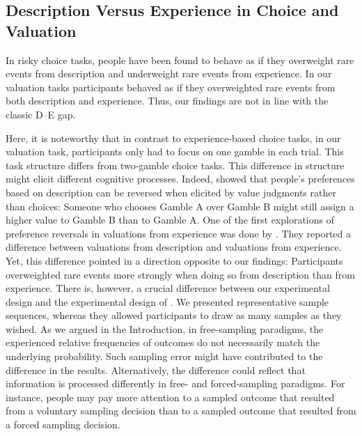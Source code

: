 \documentclass[a4paper,man, natbib]{apa6} %
\begin{document}


\subsection{Description Versus Experience in Choice and Valuation}
In risky choice tasks, people have been found to behave as if they overweight rare events from description and underweight rare events from experience. In our valuation tasks participants behaved as if they overweighted rare events from both description and experience. Thus, our findings are not in line with the classic D--E gap.

Here, it is noteworthy that in contrast to experience-based choice tasks, in our valuation task, participants only had to focus on one gamble in each trial. This task structure differs from two-gamble choice tasks. This difference in structure might elicit different cognitive processes. Indeed, \cite{Lichtenstein1971} showed that people's preferences based on description can be reversed when elicited by value judgments rather than choices: Someone who chooses Gamble A over Gamble B might still assign a higher value to Gamble B than to Gamble A. One of the first explorations of preference reversals in valuations from experience was done by \cite{Golan2014}. They reported a difference between valuations from description and valuations from experience. Yet, this difference pointed in a direction opposite to our findings: Participants overweighted rare events more strongly when doing so from description than from experience. There is, however, a crucial difference between our experimental design and the experimental design of \cite{Golan2014}. We presented representative sample sequences, whereas they allowed participants to draw as many samples as they wished. As we argued in the Introduction, in free-sampling paradigms, the experienced relative frequencies of outcomes do not necessarily match the underlying probability. Such sampling error might have contributed to the difference in the results. 
Alternatively, the difference could reflect that information is processed differently in free- and forced-sampling paradigms. For instance, people may pay more attention to a sampled outcome that resulted from a voluntary sampling decision than to a sampled outcome that resulted from a forced sampling decision.
\end{document}
